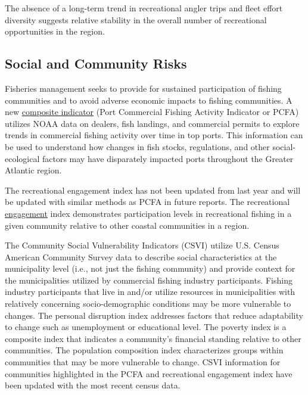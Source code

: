 \documentclass[
  10pt,
]{article}
\begin{document}
The absence of a long-term trend in recreational angler trips and fleet effort diversity suggests relative stability in the overall number of recreational opportunities in the region.

\subsection{Social and Community Risks}\label{social-and-community-risks}

Fisheries management seeks to provide for sustained participation of fishing communities and to avoid adverse economic impacts to fishing communities. A new \href{https://noaa-edab.github.io/catalog/engagement.html?q=engage\#introduction-to-indicator-72}{composite indicator} (Port Commercial Fishing Activity Indicator or PCFA) utilizes NOAA data on dealers, fish landings, and commercial permits to explore trends in commercial fishing activity over time in top ports. This information can be used to understand how changes in fish stocks, regulations, and other social-ecological factors may have disparately impacted ports throughout the Greater Atlantic region.

The recreational engagement index has not been updated from last year and will be updated with similar methods as PCFA in future reports. The recreational \href{https://noaa-edab.github.io/catalog/engagement.html}{engagement} index demonstrates participation levels in recreational fishing in a given community relative to other coastal communities in a region.

The Community Social Vulnerability Indicators (CSVI) utilize U.S. Census American Community Survey data to describe social characteristics at the municipality level (i.e., not just the fishing community) and provide context for the municipalities utilized by commercial fishing industry participants. Fishing industry participants that live in and/or utilize resources in municipalities with relatively concerning socio-demographic conditions may be more vulnerable to changes. The personal disruption index addresses factors that reduce adaptability to change such as unemployment or educational level. The poverty index is a composite index that indicates a community's financial standing relative to other communities. The population composition index characterizes groups within communities that may be more vulnerable to change. CSVI information for communities highlighted in the PCFA and recreational engagement index have been updated with the most recent census data.
\end{document}
